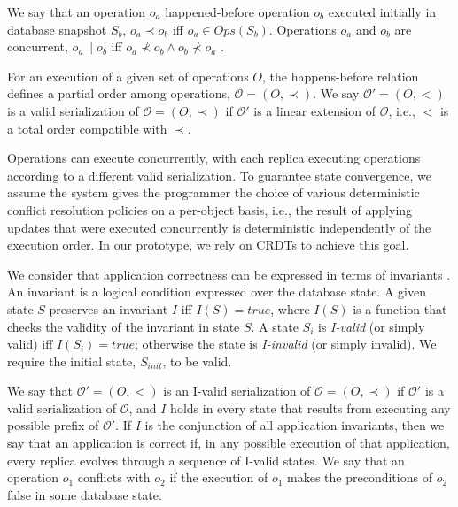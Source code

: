 \documentclass{vldb}
\begin{document}
We say that an operation $o_a$
happened-before operation $o_b$ executed initially in  database snapshot $S_b$,
$o_a \! \prec o_b$ iff \mbox{$o_a \in Ops(S_b)$}.
Operations $o_a$ and $o_b$ are concurrent, $o_a \! \parallel \! o_b$ iff
$o_a \!\not \prec o_b \! \wedge \! o_b \!\not \prec \! o_a$ \cite{happensbefore}.

For an execution of a given set of operations $O$, the happens-before relation defines
a partial order among operations, \mbox{$\mathcal{O} = (O,\prec)$}.
We say $\mathcal{O'} = (O,<)$ is a valid serialization of $\mathcal{O} = (O,\prec)$
if $\mathcal{O'}$ is a linear extension of $\mathcal{O}$, i.e., $<$ is a total order
compatible with $\prec$.

Operations can execute concurrently, with each replica
executing operations according to a different valid
serialization.
To guarantee state convergence, we assume the system gives the programmer 
the choice of various deterministic conflict resolution policies
on a per-object basis, i.e., the result of
applying updates that were executed concurrently is deterministic
independently of the execution order.
In our prototype, we rely on CRDTs
\cite{crdt,walter} to achieve this goal.

We consider that application correctness can be expressed in
terms of invariants \cite{bailisiser,indigo,cise}.
An invariant is a logical condition expressed over the database
state.
A given state $S$ preserves an invariant $I$ iff $I(S) = \mathit{true}$,
where $I(S)$ is a function that checks the validity of the invariant in state $S$.
A state $S_i$ is \emph{I-valid} (or simply valid) iff $I(S_{i}) = \mathit{true}$; otherwise the state is
\emph{I-invalid} (or simply invalid).
We require the initial state, $S_{init}$, to be valid.

We say that $\mathcal{O'} = (O,<)$ is an I-valid serialization of \mbox{$\mathcal{O} = (O,\prec)$}
if $\mathcal{O'}$ is a valid serialization of $\mathcal{O}$, and $I$ holds in every state that
results from executing any possible prefix of $\mathcal{O'}$.
If $I$ is the conjunction of all application invariants, then we say that
an application is correct if, in any possible execution of that application,
every replica evolves through a sequence of I-valid states.
We say that an operation $o_1$ conflicts with $o_2$ if the execution of
$o_1$ makes the preconditions of $o_2$ false in some database state.
\end{document}

